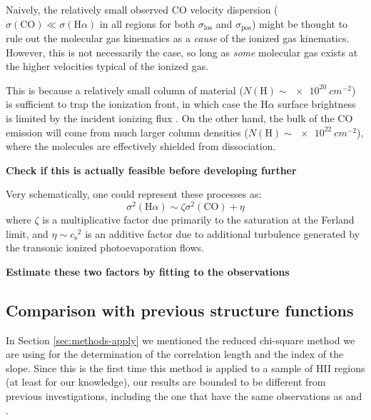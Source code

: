\documentclass[fleqn,usenatbib, useAMS, a4paper]{mnras}
\newcommand\pos{\ensuremath{_{\mathrm{pos}}}}
\newcommand\los{\ensuremath{_{\mathrm{los}}}}
\newcommand\ha{\ensuremath{\text{H}\alpha}}
\newcommand*\chem[1]{\ensuremath{\mathrm{#1}}}
\newcommand\csound{\ensuremath{c_{\text{s}}}}
\begin{document}
Naively, the relatively small observed CO velocity dispersion
(\(\sigma(\chem{CO}) \ll \sigma(\ha)\) in all regions
for both \(\sigma\los\) and \(\sigma\pos\))
might be thought to rule out the molecular gas kinematics
as a \emph{cause} of the ionized gas kinematics.
However, this is not necessarily the case, so long as \emph{some} molecular gas
exists at the higher velocities typical of the ionized gas.

This is because a relatively small column of material
(\(N(\chem{H}) \sim \SI{e20}{cm^{-2}}\))
is sufficient to trap the ionization front,
in which case the \ha{} surface brightness is limited by the
incident ionizing flux
\citetext{the Ferland mechanism,
  see section~5.1 of \citealt{Baldwin:1991a}
  and section~B.2.1 of \citealt{Ferland:2012a}
}.
On the other hand, the bulk of the CO emission will come from much larger
column densities (\(N(\chem{H}) \sim \SI{e22}{cm^{-2}}\)),
where the molecules are effectively shielded from dissociation.

\textbf{Check  if this is actually feasible before developing further}

Very schematically, one could represent these processes as:
\begin{equation}
  \label{eq:1}
  \sigma^2(\ha) \sim \zeta \sigma^2(\chem{CO}) + \eta
\end{equation}
where \(\zeta\) is a multiplicative factor
due primarily to the saturation at the Ferland limit,
and \(\eta \sim \csound^2\) is an additive factor due to additional turbulence
generated by the transonic ionized photoevaporation flows.

\textbf{Estimate these two factors by fitting to the observations}

\subsection{Comparison with previous structure functions}

In Section \ref{sec:methods-apply} we mentioned the reduced chi-square method we are using for the determination of the correlation length and the index of the slope. Since this is the first time this method is applied to a sample of HII regions (at least for our knowledge), our results are bounded to be different from previous investigations, including the one that have the same observations as \citet{arthur2016turbulence} and \citet{2019arXiv191203543M}. 
\end{document}
